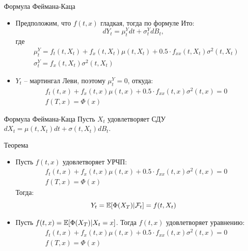 \documentclass[aspectratio=169]{beamer}
\begin{document}
\begin{frame}{Формула Феймана-Каца}
    \begin{itemize}
        \item Предположим, что $f(t, x)$ гладкая, тогда по формуле Ито:
        $$
            dY_t = \mu^Y_t dt + \sigma^Y_t dB_t,
        $$где \noident
        \begin{align*}
            &\mu^Y_t = f_t(t, X_t) + f_x(t, X_t) \mu(t, X_t) + 0.5 \cdot f_{xx}(t, X_t) \sigma^2(t,X_t) \\
            &\sigma_t^Y = f_x(t, X_t) \sigma^2(t, X_t) 
        \end{align*}
        \item $Y_t$ -- мартингал Леви, поэтому $\mu^Y_t = 0$, откуда:\noident
        \begin{align*}
            &f_t(t, x) + f_x(t, x) \mu(t, x) + 0.5 \cdot f_{xx}(t, x) \sigma^2(t, x) = 0 \\
            &f(T, x) = \Phi(x)
        \end{align*}
    \end{itemize}
\end{frame}

\begin{frame}{Формула Феймана-Каца}
    Пусть $X_t$ удовлетворяет СДУ $dX_t = \mu(t, X_t) dt + \sigma(t, X_t) dB_t$. 
    \begin{block}{Теорема}
    \begin{itemize}
        \item Пусть $f(t, x)$ удовлетворяет УРЧП:
        \begin{align*}
            &f_t(t, x) + f_x(t, x) \mu(t, x) + 0.5 \cdot f_{xx}(t, x) \sigma^2(t, x) = 0 \\
            &f(T, x) = \Phi(x)
        \end{align*} Тогда:
        $$
            Y_t = \mathbb{E}[\Phi(X_T) | \mathcal{F}_t] = f(t, X_t)
        $$

        \item Пусть $f(t, x) = \mathbb{E}[\Phi(X_T) | X_t = x]$. Тогда $f(t, x)$ удовлетворяет уравнению:
        \begin{align*}
            &f_t(t, x) + f_x(t, x) \mu(t, x) + 0.5 \cdot f_{xx}(t, x) \sigma^2(t, x) = 0 \\
            &f(T, x) = \Phi(x)
        \end{align*}
    \end{itemize}
    \end{block}
\end{frame}
\end{document}
